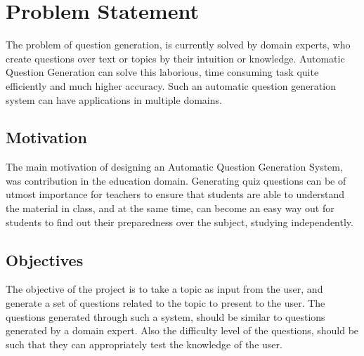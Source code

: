 \chapter{Problem Statement} 

The problem of question generation, is currently solved by domain experts, who
create questions over text or topics by their intuition or knowledge. Automatic
Question Generation can solve this laborious, time consuming task quite
efficiently and much higher accuracy. Such an automatic question generation
system can have applications in multiple domains. 

\section{Motivation} 

The main motivation of designing an Automatic Question Generation System, was
contribution in the education domain. Generating quiz questions can be of utmost
importance for teachers to ensure that students are able to understand the
material in class, and at the same time, can become an easy way out for students
to find out their preparedness over the subject, studying independently. 

\section{Objectives}

The objective of the project is to take a topic as input from the user, and
generate a set of questions related to the topic to present to the user. The
questions generated through such a system, should be similar to questions
generated by a domain expert. Also the difficulty level of the questions, should
be such that they can appropriately test the knowledge of the user. 

